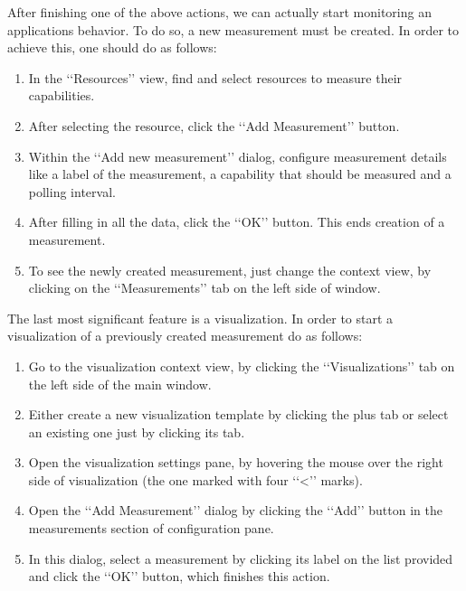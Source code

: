 After finishing one of the above actions, we can actually start monitoring an applications behavior. To do so, a new measurement must be created. In order to achieve this, one should do as follows:

\begin{enumerate}

\item In the \lq\lq{}Resources\rq\rq{} view, find and select resources to measure their capabilities.

\item After selecting the resource, click the \lq\lq{}Add Measurement\rq\rq{} button.

\item Within the \lq\lq{}Add new measurement\rq\rq{} dialog, configure measurement details like a label of the measurement, a capability that should be measured and a polling interval.

\item After filling in all the data, click the \lq\lq{}OK\rq\rq{} button. This ends creation of a measurement. 

\item To see the newly created measurement, just change the context view, by clicking on the \lq\lq{}Measurements\rq\rq{} tab on the left side of window.

\end{enumerate}

The last most significant feature is a visualization. In order to start a visualization of a previously created measurement do as follows:

\begin{enumerate}

\item Go to the visualization context view, by clicking the \lq\lq{}Visualizations\rq\rq{} tab on the left side of the main window.

\item Either create a new visualization template by clicking the plus tab or select an existing one just by clicking its tab.

\item Open the visualization settings pane, by hovering the mouse over the right side of visualization (the one marked with four \lq\lq{}<\rq\rq{} marks).

\item Open the \lq\lq{}Add Measurement\rq\rq{} dialog by clicking the \lq\lq{}Add\rq\rq{} button in the measurements section of configuration pane.

\item In this dialog, select a measurement by clicking its label on the list provided and click the \lq\lq{}OK\rq\rq{} button, which finishes this action.

\end{enumerate}

